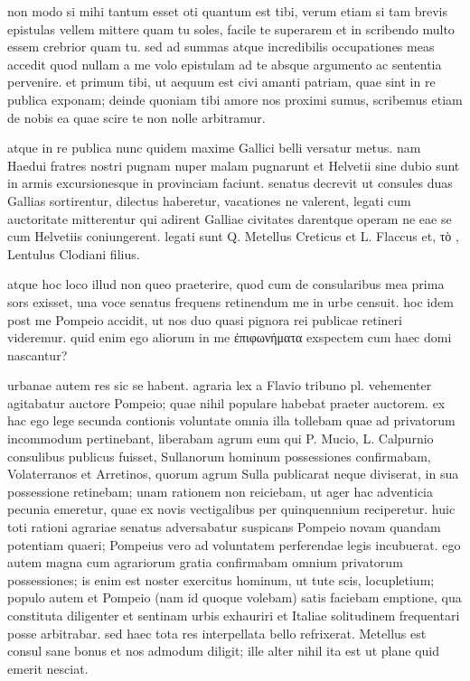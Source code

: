 


 non modo si mihi tantum esset oti quantum est tibi, verum etiam si tam brevis epistulas vellem mittere quam tu soles, facile te superarem et in scribendo multo essem crebrior quam tu. sed ad summas atque incredibilis occupationes meas accedit quod nullam a me volo epistulam ad te absque argumento ac sententia pervenire. et primum tibi, ut aequum est civi amanti patriam, quae sint in re publica exponam; deinde quoniam tibi amore nos proximi sumus, scribemus etiam de nobis ea quae scire te non nolle arbitramur.

 atque in re publica nunc quidem maxime Gallici belli versatur metus. nam Haedui fratres nostri pugnam nuper malam pugnarunt et Helvetii sine dubio sunt in armis excursionesque in provinciam faciunt. senatus decrevit ut consules duas Gallias sortirentur, dilectus haberetur, vacationes ne valerent, legati cum auctoritate mitterentur qui adirent Galliae civitates darentque operam ne eae se cum Helvetiis coniungerent. legati sunt Q. Metellus Creticus et L. Flaccus et, τὸ , Lentulus Clodiani filius.

 atque hoc loco illud non queo praeterire, quod cum de consularibus mea prima sors exisset, una voce senatus frequens retinendum me in urbe censuit. hoc idem post me Pompeio accidit, ut nos duo quasi pignora rei publicae retineri videremur. quid enim ego aliorum in me ἐπιφωνήματα exspectem cum haec domi nascantur?

 urbanae autem res sic se habent. agraria lex a Flavio tribuno pl. vehementer agitabatur auctore Pompeio; quae nihil populare habebat praeter auctorem. ex hac ego lege secunda contionis voluntate omnia illa tollebam quae ad privatorum incommodum pertinebant, liberabam agrum eum qui P. Mucio, L. Calpurnio consulibus publicus fuisset, Sullanorum hominum possessiones confirmabam, Volaterranos et Arretinos, quorum agrum Sulla publicarat neque diviserat, in sua possessione retinebam; unam rationem non reiciebam, ut ager hac adventicia pecunia emeretur, quae ex novis vectigalibus per quinquennium reciperetur. huic toti rationi agrariae senatus adversabatur suspicans Pompeio novam quandam potentiam quaeri; Pompeius vero ad voluntatem perferendae legis incubuerat. ego autem magna cum agrariorum gratia confirmabam omnium privatorum possessiones; is enim est noster exercitus hominum, ut tute scis, locupletium; populo autem et Pompeio (nam id quoque volebam) satis faciebam emptione, qua constituta diligenter et sentinam urbis exhauriri et Italiae solitudinem frequentari posse arbitrabar. sed haec tota res interpellata bello refrixerat. Metellus est consul sane bonus et nos admodum diligit; ille alter nihil ita est ut plane quid emerit nesciat.

